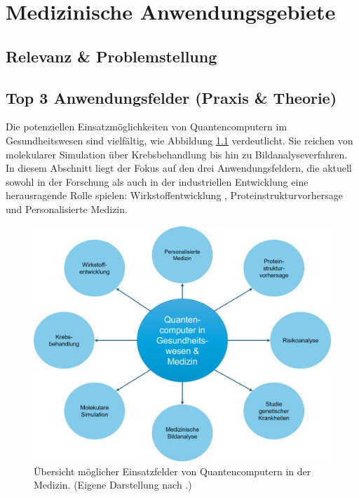 \chapter{Medizinische Anwendungsgebiete}
\label{trends} %



\section{Relevanz \& Problemstellung}


\section{Top 3 Anwendungsfelder (Praxis \& Theorie)}
\label{med:applicationFields}
Die potenziellen Einsatzmöglichkeiten von Quantencomputern im Gesundheitswesen sind vielfältig, wie Abbildung \ref{fig:use-cases-medicine} verdeutlicht. Sie reichen von molekularer Simulation über Krebsbehandlung bis hin zu Bildanalyseverfahren. In diesem Abschnitt liegt der Fokus auf den drei Anwendungsfeldern, die aktuell sowohl in der Forschung als auch in der industriellen Entwicklung eine herausragende Rolle spielen: Wirkstoffentwicklung , Proteinstrukturvorhersage und Personalisierte Medizin.\\

\begin{figure}[ht]
    \centering
    \includegraphics[width=.8\textwidth]{images/medicine/AnwendungsfelderMedizin.png}
    \caption{Übersicht möglicher Einsatzfelder von Quantencomputern in der Medizin. (Eigene Darstellung nach \cite{dhande_quantum_2023}.)}
    \label{fig:use-cases-medicine}
\end{figure}

